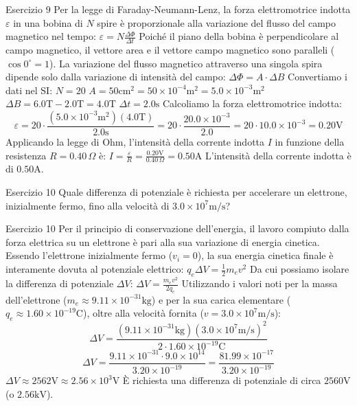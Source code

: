 \documentclass[a4paper]{article}
\begin{document}
\begin{snippetsolution}{Esercizio 9}
    Per la legge di Faraday-Neumann-Lenz, la forza elettromotrice indotta \(\varepsilon\) in una bobina di \(N\) spire è proporzionale alla variazione del flusso del campo magnetico nel tempo:
    \(\varepsilon = N \frac{\Delta \Phi}{\Delta t}\)
    Poiché il piano della bobina è perpendicolare al campo magnetico, il vettore area e il vettore campo magnetico sono paralleli (\(\cos 0^\circ = 1\)). La variazione del flusso magnetico attraverso una singola spira dipende solo dalla variazione di intensità del campo:
    \(\Delta \Phi = A \cdot \Delta B\)
    Convertiamo i dati nel SI:
    \(N = 20\)
    \(A = 50 \mathrm{cm^2} = 50 \times 10^{-4} \mathrm{m^2} = 5.0 \times 10^{-3} \mathrm{m^2}\)
    \(\Delta B = 6.0 \mathrm{T} - 2.0 \mathrm{T} = 4.0 \mathrm{T}\)
    \(\Delta t = 2.0 \mathrm{s}\)
    Calcoliamo la forza elettromotrice indotta:
    \[\varepsilon = 20 \cdot \frac{(5.0 \times 10^{-3} \mathrm{m^2})(4.0 \mathrm{T})}{2.0 \mathrm{s}} = 20 \cdot \frac{20.0 \times 10^{-3}}{2.0} = 20 \cdot 10.0 \times 10^{-3} = 0.20 \mathrm{V}\]
    Applicando la legge di Ohm, l'intensità della corrente indotta \(I\) in funzione della resistenza \(R = 0.40 \, \Omega\) è:
    \(I = \frac{\varepsilon}{R} = \frac{0.20 \mathrm{V}}{0.40 \, \Omega} = 0.50 \mathrm{A}\)
    L'intensità della corrente indotta è di \(0.50 \mathrm{A}\).
\end{snippetsolution}
\begin{snippetexercise}{Esercizio 10}
    Quale differenza di potenziale è richiesta per accelerare un elettrone, inizialmente fermo,
    fino alla velocità di \(3.0 \times 10^7 \mathrm{m/s}\)?
\end{snippetexercise}
\begin{snippetsolution}{Esercizio 10}
    Per il principio di conservazione dell'energia, il lavoro compiuto dalla forza elettrica su un elettrone è pari alla sua variazione di energia cinetica. Essendo l'elettrone inizialmente fermo (\(v_i = 0\)), la sua energia cinetica finale è interamente dovuta al potenziale elettrico:
    \(q_e \Delta V = \frac{1}{2} m_e v^2\)
    Da cui possiamo isolare la differenza di potenziale \(\Delta V\):
    \(\Delta V = \frac{m_e v^2}{2 q_e}\)
    Utilizzando i valori noti per la massa dell'elettrone (\(m_e \approx 9.11 \times 10^{-31} \mathrm{kg}\)) e per la sua carica elementare (\(q_e \approx 1.60 \times 10^{-19} \mathrm{C}\)), oltre alla velocità fornita (\(v = 3.0 \times 10^7 \mathrm{m/s}\)):
    \[\Delta V = \frac{(9.11 \times 10^{-31} \mathrm{kg})(3.0 \times 10^7 \mathrm{m/s})^2}{2 \cdot 1.60 \times 10^{-19} \mathrm{C}}\]
    \[\Delta V = \frac{9.11 \times 10^{-31} \cdot 9.0 \times 10^{14}}{3.20 \times 10^{-19}} = \frac{81.99 \times 10^{-17}}{3.20 \times 10^{-19}}\]
    \(\Delta V \approx 2562 \mathrm{V} \approx 2.56 \times 10^3 \mathrm{V}\)
    È richiesta una differenza di potenziale di circa \(2560 \mathrm{V}\) (o \(2.56 \mathrm{kV}\)).
\end{snippetsolution}
\end{document}
